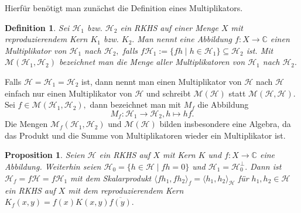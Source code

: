 \documentclass[12pt,titlepage,twoside,cleardoublepage]{article}
\theoremstyle{nummermitklammern}
\newtheorem{definition}[temp]{Definition}
\newtheorem{definition}[zahl]{Definition}
\numberwithin{equation}{section}
\newtheorem{proposition}[zahl]{Proposition}
\begin{document}
Hierfür benötigt man zunächst die Definition eines Multiplikators.
\begin{definition}
Sei $\mathcal{H}_1$ bzw. $\mathcal{H}_2$ ein RKHS  auf einer Menge $X$ mit reproduzierendem Kern $K_1$ bzw. $K_2.$ Man nennt eine Abbildung $f:X\to \mathbb{C}$ einen \emph{Multiplikator} von $\mathcal{H}_1$ nach $\mathcal{H}_2,$ falls $f\mathcal{H}_1:=\{fh\mid h\in \mathcal{H}_1\}\subseteq \mathcal{H}_2$ ist. Mit $\mathcal{M}(\mathcal{H}_1,\mathcal{H}_2)$ bezeichnet man die Menge aller Multiplikatoren von $\mathcal{H}_1$ nach $\mathcal{H}_2.$
 \end{definition}
 Falls $\mathcal{H}=\mathcal{H}_1=\mathcal{H}_2$ ist, dann nennt man einen Multiplikator von $\mathcal{H}$ nach $\mathcal{H}$ einfach nur einen Multiplikator von $\mathcal{H}$ und schreibt $\mathcal{M}(\mathcal{H})$ statt $\mathcal{M}(\mathcal{H},\mathcal{H}).$ \\
 Sei $f\in\mathcal{M}( \mathcal{H}_1,\mathcal{H}_2),$ dann bezeichnet man mit $M_f$ die Abbildung
 \[
 M_f:\mathcal{H}_1\to\mathcal{H}_2,h\mapsto hf.
\]
Die Mengen $\mathcal{M}_f(\mathcal{H}_1,\mathcal{H}_2)$ und $\mathcal{M}(\mathcal{H})$ bilden insbesondere eine Algebra, da das Produkt und die Summe von Multiplikatoren wieder ein Multiplikator ist. \\

\begin{proposition}
Seien $\mathcal{H}$ ein RKHS auf $X$ mit Kern $K$ und $f:X\to \mathbb{C}$ eine Abbildung.
 Weiterhin seien $\mathcal{H}_0=\{h\in \mathcal{H}\mid fh=0\}$ und $\mathcal{H}_1=\mathcal{H}_0^{\bot}.$ Dann ist $\mathcal{H}_f=f\mathcal{H}=f\mathcal{H}_1$ mit dem Skalarprodukt $\langle fh_1,fh_2\rangle_f=\langle h_1,h_2 \rangle_{\mathcal{H}}$ für $h_1,h_2\in \mathcal{H}$ ein RKHS auf $X$ mit dem reproduzierendem Kern $K_f(x,y)=f(x)K(x,y)\overline{ f(y) }.$

\end{proposition}
\end{document}
